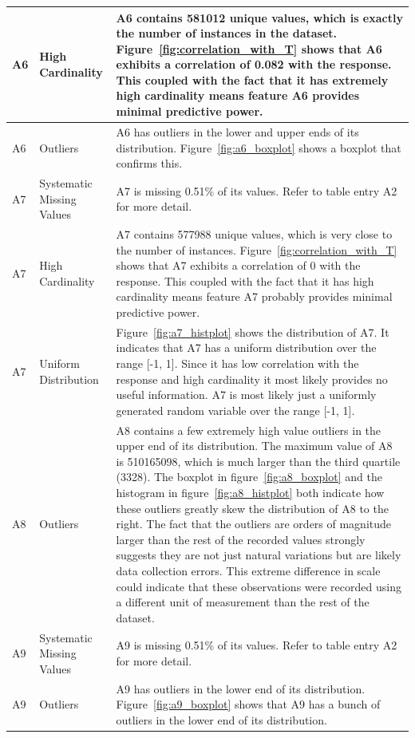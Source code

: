 \documentclass[11pt]{report}
\begin{document}
\begin{longtable}{lp{4cm}p{7cm}}
\midrule
A6 & High Cardinality & A6 contains 581012 unique values, which is exactly the number of instances in the dataset. Figure~\ref{fig:correlation_with_T} shows that A6 exhibits a correlation of 0.082 with the response. This coupled with the fact that it has extremely high cardinality means feature A6 provides minimal predictive power. \\
\midrule
A6 & Outliers & A6 has outliers in the lower and upper ends of its distribution. Figure~\ref{fig:a6_boxplot} shows a boxplot that confirms this. \\
\midrule
A7 & Systematic Missing Values & A7 is missing 0.51\% of its values.  Refer to table entry A2 for more detail. \\
\midrule
A7 & High Cardinality & A7 contains 577988 unique values, which is very close to the number of instances. Figure~\ref{fig:correlation_with_T} shows that A7 exhibits a correlation of 0 with the response. This coupled with the fact that it has high cardinality means feature A7 probably provides minimal predictive power. \\
\midrule
A7 & Uniform Distribution & Figure~\ref{fig:a7_histplot} shows the distribution of A7. It indicates that A7 has a uniform distribution over the range [-1, 1]. Since it has low correlation with the response and high cardinality it most likely provides no useful information. A7 is most likely just a uniformly generated random variable over the range [-1, 1]. \\
\midrule
A8 & Outliers & A8 contains a few extremely high value outliers in the upper end of its distribution. The maximum value of A8 is 510165098, which is much larger than the third quartile (3328). The boxplot in figure~\ref{fig:a8_boxplot} and the histogram in figure~\ref{fig:a8_histplot} both indicate how these outliers greatly skew the distribution of A8 to the right. The fact that the outliers are orders of magnitude larger than the rest of the recorded values strongly suggests they are not just natural variations but are likely data collection errors. This extreme difference in scale could indicate that these observations were recorded using a different unit of measurement than the rest of the dataset. \\
\midrule
A9 & Systematic Missing Values & A9 is missing 0.51\% of its values.  Refer to table entry A2 for more detail. \\
\midrule
A9 & Outliers & A9 has outliers in the lower end of its distribution. Figure~\ref{fig:a9_boxplot} shows that A9 has a bunch of outliers in the lower end of its distribution. \\

\end{longtable}
\end{document}
